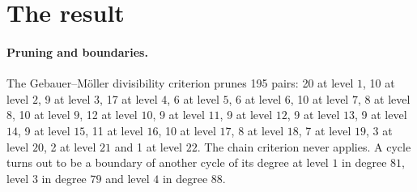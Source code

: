 \documentclass[11pt]{article}
\begin{document}
\section{The result}

\paragraph{Pruning and boundaries.} The Gebauer--M\"oller divisibility criterion prunes 195 pairs: 20 at level $1$, 10 at level $2$, 9 at level $3$, 17 at level $4$, 6 at level $5$, 6 at level $6$, 10 at level $7$, 8 at level $8$, 10 at level $9$, 12 at level $10$, 9 at level $11$, 9 at level $12$, 9 at level $13$, 9 at level $14$, 9 at level $15$, 11 at level $16$, 10 at level $17$, 8 at level $18$, 7 at level $19$, 3 at level $20$, 2 at level $21$ and 1 at level $22$. The chain criterion never applies. A cycle turns out to be a boundary of another cycle of its degree at level $1$ in degree $81$, level $3$ in degree $79$ and level $4$ in degree $88$.
\end{document}
